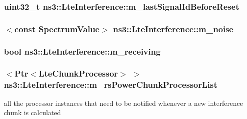\subsubsection[{\texorpdfstring{m\+\_\+last\+Signal\+Id\+Before\+Reset}{m_lastSignalIdBeforeReset}}]{\setlength{\rightskip}{0pt plus 5cm}uint32\+\_\+t ns3\+::\+Lte\+Interference\+::m\+\_\+last\+Signal\+Id\+Before\+Reset\hspace{0.3cm}{\ttfamily [private]}}\hypertarget{classns3_1_1LteInterference_a462e2bdb7a6db3f5e1718ac216fe45c1}{}\label{classns3_1_1LteInterference_a462e2bdb7a6db3f5e1718ac216fe45c1}
\subsubsection[{\texorpdfstring{m\+\_\+noise}{m_noise}}]{$<$const {\bf Spectrum\+Value}$>$ ns3\+::\+Lte\+Interference\+::m\+\_\+noise\hspace{0.3cm}{\ttfamily [private]}}\hypertarget{classns3_1_1LteInterference_a9d4450468cc82d258490f44f487d2fb4}{}\label{classns3_1_1LteInterference_a9d4450468cc82d258490f44f487d2fb4}
\subsubsection[{\texorpdfstring{m\+\_\+receiving}{m_receiving}}]{\setlength{\rightskip}{0pt plus 5cm}bool ns3\+::\+Lte\+Interference\+::m\+\_\+receiving\hspace{0.3cm}{\ttfamily [private]}}\hypertarget{classns3_1_1LteInterference_a12580fdb6df9e6afa3fc4f3c68648bf3}{}\label{classns3_1_1LteInterference_a12580fdb6df9e6afa3fc4f3c68648bf3}
\subsubsection[{\texorpdfstring{m\+\_\+rs\+Power\+Chunk\+Processor\+List}{m_rsPowerChunkProcessorList}}]{$<${\bf Ptr}$<${\bf Lte\+Chunk\+Processor}$>$ $>$ ns3\+::\+Lte\+Interference\+::m\+\_\+rs\+Power\+Chunk\+Processor\+List\hspace{0.3cm}{\ttfamily [private]}}\hypertarget{classns3_1_1LteInterference_a4b261932ab7620cf1303dfbf4cdba6b5}{}\label{classns3_1_1LteInterference_a4b261932ab7620cf1303dfbf4cdba6b5}
all the processor instances that need to be notified whenever a new interference chunk is calculated 
